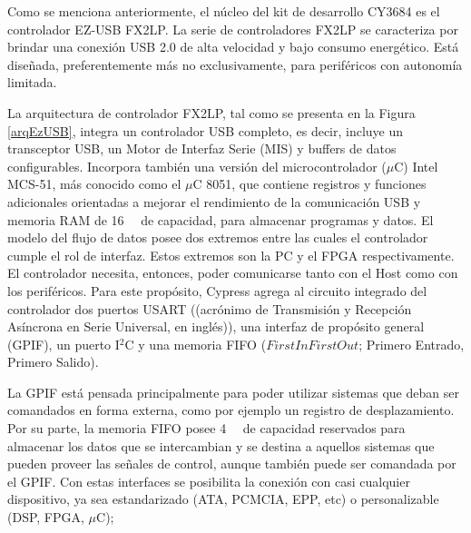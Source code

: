Como se menciona anteriormente, el núcleo del kit de desarrollo CY3684 es el controlador EZ-USB FX2LP. La serie de controladores FX2LP se caracteriza por brindar una conexión USB 2.0 de alta velocidad y bajo consumo energético. Está diseñada, preferentemente más no exclusivamente, para periféricos con autonomía limitada.

La arquitectura de controlador FX2LP, tal como se presenta en la Figura \ref{arqEzUSB}, integra un controlador USB completo, es decir, incluye un transceptor USB, un Motor de Interfaz Serie (MIS) y buffers de datos configurables. Incorpora también una versión del microcontrolador ($\mu$C) Intel MCS-51, más conocido como el $\mu$C 8051, que contiene registros y funciones adicionales orientadas a mejorar el rendimiento de la comunicación USB y memoria RAM de \SI{16}{\kilo\byte} de capacidad, para almacenar programas y datos. 
El modelo del flujo de datos posee dos extremos entre las cuales el controlador cumple el rol de interfaz. Estos extremos son la PC y el FPGA respectivamente. El controlador necesita, entonces, poder comunicarse tanto con el Host como con los periféricos. Para este propósito, Cypress agrega al circuito integrado del controlador dos puertos USART ((acrónimo de Transmisión y Recepción Asíncrona en Serie Universal, en inglés)), una interfaz de propósito general (GPIF), un puerto I$^2$C y una memoria FIFO (\(First In First Out\); Primero Entrado, Primero Salido).

La GPIF está pensada principalmente para poder utilizar sistemas que deban ser comandados en forma externa, como por ejemplo un registro de desplazamiento. Por su parte, la memoria FIFO posee \SI{4}{\kilo\byte} de capacidad reservados para almacenar los datos que se intercambian y se destina a aquellos sistemas que pueden proveer las señales de control, aunque también puede ser comandada por el GPIF. Con estas interfaces se posibilita la conexión con casi cualquier dispositivo, ya sea estandarizado (ATA, PCMCIA, EPP, etc) o personalizable (DSP, FPGA, $\mu$C);

